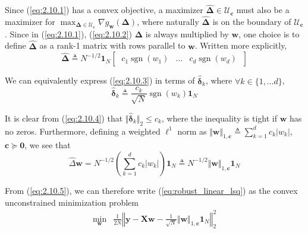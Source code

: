 \documentclass{article}
\numberwithin{equation}{section}
\begin{document}
Since (\ref{eq:2.10.1}) has a convex objective, a maximizer
$ \hat{\boldsymbol{\Delta}} \in \mathcal{U}_\mathbf{c} $ must also be a
maximizer for $ \max_{\boldsymbol{\Delta} \in
\mathcal{U}_\mathbf{c}}\nabla g_\mathbf{w}(\boldsymbol{\Delta}) $, where
naturally $ \hat{\boldsymbol{\Delta}} $ is on the boundary of
$ \mathcal{U}_\mathbf{c} $. Since in (\ref{eq:2.10.1}), (\ref{eq:2.10.2})
$ \boldsymbol{\Delta} $ is always multiplied by $ \mathbf{w} $, one choice is
to define $ \hat{\boldsymbol{\Delta}} $ as a rank-1 matrix with rows parallel
to $ \mathbf{w} $. Written more explicitly,
\begin{equation} \label{eq:2.10.3}
    \hat{\boldsymbol{\Delta}} \triangleq N^{-1 / 2}\mathbf{1}_N\begin{bmatrix}
        \ c_1\operatorname{sgn}(w_1) & \ldots & c_d\operatorname{sgn}(w_d) \
    \end{bmatrix}
\end{equation}

We can equivalently express (\ref{eq:2.10.3}) in terms of
$ \hat{\boldsymbol{\delta}}_k $, where $ \forall k \in \{1, \ldots d\} $,
\begin{equation} \label{eq:2.10.4}
    \hat{\boldsymbol{\delta}}_k \triangleq
    \frac{c_k}{\sqrt{N}}{\operatorname{sgn}(w_k)}\mathbf{1}_N
\end{equation}

It is clear from (\ref{eq:2.10.4}) that
$ \Vert\hat{\boldsymbol{\delta}}_k\Vert_2 \le c_k $, where the inequality is
tight if $ \mathbf{w} $ has no zeros. Furthermore, defining a weighted
$ \ell^1 $ norm as $ \Vert\mathbf{w}\Vert_{1, \mathbf{c}} \triangleq
\sum_{k = 1}^dc_k|w_k| $, $ \mathbf{c} \succeq \mathbf{0} $, we see that
\begin{equation} \label{eq:2.10.5}
    \hat{\Delta}\mathbf{w} =
    N^{-1 / 2}\left(\sum_{k = 1}^dc_k|w_k|\right)\mathbf{1}_N \triangleq
    N^{-1 / 2}\Vert\mathbf{w}\Vert_{1, \mathbf{c}}\mathbf{1}_N
\end{equation}

From (\ref{eq:2.10.5}), we can therefore write (\ref{eq:robust_linear_lsq}) as
the convex unconstrained minimization problem
\begin{equation} \label{eq:2.10.6}
    \begin{array}{rl}
        \displaystyle\min_\mathbf{w} &
        \frac{1}{2N}\left\Vert
            \mathbf{y} - \mathbf{Xw} -
            \frac{1}{\sqrt{N}}\Vert\mathbf{w}\Vert_{1, \mathbf{c}}\mathbf{1}_N
        \right\Vert_2^2
    \end{array}
\end{equation}
\end{document}
